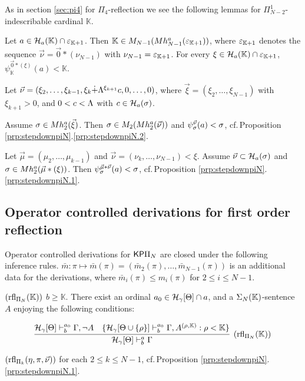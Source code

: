 \documentclass{article}
\newcommand{\mK}{\mathbb{K}}
\begin{document}
As in section \ref{sec:pi4} for $\Pi_{4}$-reflection we see the following lemmas
for $\Pi^{1}_{N-2}$-indescribable cardinal $\mK$.


\blem\label{lem:psiKN}
Let $a\in\calh_{a}(\mK)\cap\veps_{\mK+1}$. Then
$\mK\in M_{N-1}(Mh^{a}_{N-1}(\veps_{\mK+1}))$, where
$\veps_{\mK+1}$ denotes the sequence $\vec{\nu}=\vec{0}*(\nu_{N-1})$ with $\nu_{N-1}=\veps_{\mK+1}$.
For every $\xi\in\calh_{a}(\mK)\cap\veps_{\mK+1}$,
$\psi_{\mK}^{\vec{0}*(\xi)}(a)<\mK$.
\elem


\blem\label{lem:stepdownpiN}
Let $\vec{\nu}=(\xi_{2},\ldots,\xi_{k-1},\xi_{k}\dot{+}\Lambda^{\xi_{k+1}}c,0,\ldots,0)$, where
$\vec{\xi}=(\xi_{2},\ldots,\xi_{N-1})$ with $\xi_{k+1}>0$,
and $0<c<\Lambda$ with $c\in{\cal H}_{a}(\sigma)$.

Assume $\sigma\in Mh_{2}^{a}(\vec{\xi})$.
Then
$\sigma\in M_{2}(Mh^{a}_{2}(\vec{\nu}))$ and
$\psi_{\sigma}^{\vec{\nu}}(a)<\sigma$, cf.\,Proposition \ref{prp:stepdownpiN}.\ref{prp:stepdownpiN.2}.
\elem

\blem\label{lem:piNdown}
Let $\vec{\mu}=(\mu_{2},\ldots,\mu_{k-1})$ and
$\vec{\nu}=(\nu_{k},\ldots,\nu_{N-1})<\xi$.
Assume $\vec{\nu}\subset{\cal H}_{a}(\sigma)$ and 
$\sigma\in Mh_{2}^{a}(\vec{\mu}*(\xi))$.
Then $\psi_{\sigma}^{\vec{\mu}*\vec{\nu}}(a)<\sigma$, cf.\,Proposition \ref{prp:stepdownpiN}.\ref{prp:stepdownpiN.1}.
\elem

\subsection{Operator controlled derivations for first order reflection}

Operator controlled derivations for ${\sf KP}\Pi_{N}$ are closed under the following inference rules.
$\bar{m}:\pi\mapsto\bar{m}(\pi)=(\bar{m}_{2}(\pi),\ldots,\bar{m}_{N-1}(\pi))$ is an
 additional data for the derivations,
where $\bar{m}_{i}(\pi)\leq m_{i}(\pi)$ for $2\leq i\leq N-1$.




\bdes
\item[$({\rm rfl}_{\Pi_{N}}(\mK))$]
$b\geq\mK$.
There exist 
an ordinal $a_{0}\in{\cal H}_{\gamma}[\Theta]\cap a$,
and a $\Sig_{N}(\mK)$-sentence $A$ enjoying the following conditions:

\[
\infer[({\rm rfl}_{\Pi_{N}}(\mK))]{
\calh_{\gam}[\Tht]\vdash^{a}_{b}\Gam}
{
\mathcal{H}_{\gam}[\Tht]\vdash^{a_{0}}_{b}\Gamma, \lnot A
&
\{
\mathcal{H}_{\gam}[\Tht\cup \{\rho\}]\vdash^{a_{0}}_{b}\Gamma, 
A^{(\rho,\mK)}: \rho<\mK\}
}
\]


\item[$({\rm rfl}_{\Pi_{k}}(\eta,\pi,\vec{\nu}))$]
for each $2\leq k\leq N-1$, cf.\,Proposition \ref{prp:stepdownpiN}.\ref{prp:stepdownpiN.1}.
\end{document}
